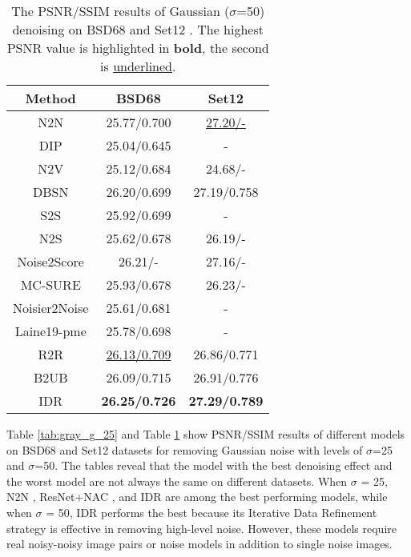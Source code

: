 \documentclass[conference]{IEEEtran}
\begin{document}
\begin{table}[t]
	\setlength{\abovecaptionskip}{0cm}
	\setlength{\belowcaptionskip}{0cm}
	\caption{The PSNR/SSIM results of Gaussian ($\sigma$=50) denoising on BSD68 \cite{roth2005fields} and Set12 \cite{dabov2007image}. The highest PSNR value is highlighted in \textbf {bold}, the second is \underline{underlined}.}
	\centering
	\begin{tabular*}{\hsize}{c@{\extracolsep{\fill}}c@{\extracolsep{\fill}}c@{\extracolsep{\fill}}}
		\hline
		Method & BSD68 & Set12 \\
		\hline
		N2N \cite{lehtinen2018noise2noise}	 &25.77/0.700 &	\underline{27.20/-}\\
		DIP \cite{ulyanov2018deep} &	25.04/0.645 & -	\\
		N2V \cite{krull2019noise2void}	 &25.12/0.684 &	24.68/-\\
		DBSN \cite{wu2020unpaired} &	26.20/0.699	 &27.19/0.758\\
		S2S \cite{quan2020self2self} &	25.92/0.699	 & -\\
		N2S \cite{batson2019noise2self}	 &25.62/0.678 &	26.19/-\\
		Noise2Score \cite{kim2021noise2score} &	26.21/- &	27.16/-\\
		MC-SURE \cite{ramani2008monte} &	25.93/0.678 &	26.23/-\\
		Noisier2Noise \cite{moran2020noisier2noise} &	25.61/0.681	 & -\\
		Laine19-pme \cite{laine2019high}	 &25.78/0.698 & -	\\
		R2R\cite{pang2021recorrupted}	 &\underline{26.13/0.709} &	26.86/0.771\\
		B2UB\cite{wang2022blind2unblind} &	26.09/0.715	 &26.91/0.776\\
		IDR \cite{zhang2022idr} &	{\bf 26.25/0.726}	 & {\bf 27.29/0.789}\\
		\hline
	\end{tabular*}
	\setlength{\belowcaptionskip}{-0.5cm}
	\label{tab:gray_g_50}
\vspace{-2em}
\end{table}

Table \ref{tab:gray_g_25} and Table \ref{tab:gray_g_50} show PSNR/SSIM results of different models on BSD68\cite{roth2005fields} and Set12\cite{dabov2007image} datasets for removing Gaussian noise with levels of $\sigma$=25 and $\sigma$=50. The tables reveal that the model with the best denoising effect and the worst model are not always the same on different datasets. When $\sigma$ = 25, N2N \cite{lehtinen2018noise2noise}, ResNet+NAC \cite{xu2020noisy}, and IDR \cite{zhang2022idr} are among the best performing models, while when $\sigma$ = 50, IDR performs the best because its Iterative Data Refinement strategy is effective in removing high-level noise. However, these models require real noisy-noisy image pairs or noise models in addition to single noise images.
\end{document}
